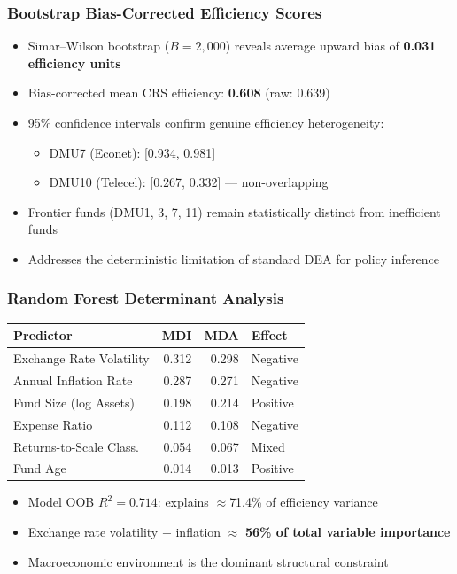 \documentclass{beamer}
\begin{document}
\begin{frame}
    \frametitle{Bootstrap Bias-Corrected Efficiency Scores}
    \begin{itemize}
        \item Simar--Wilson bootstrap ($B = 2{,}000$) reveals average upward bias of \textbf{0.031 efficiency units}
        \item Bias-corrected mean CRS efficiency: \textbf{0.608} (raw: 0.639)
        \item 95\% confidence intervals confirm genuine efficiency heterogeneity:
        \begin{itemize}
            \item DMU7 (Econet): [0.934, 0.981]
            \item DMU10 (Telecel): [0.267, 0.332] --- non-overlapping
        \end{itemize}
        \item Frontier funds (DMU1, 3, 7, 11) remain statistically distinct from inefficient funds
        \item Addresses the deterministic limitation of standard DEA for policy inference
    \end{itemize}
\end{frame}

\begin{frame}
    \frametitle{Random Forest Determinant Analysis}
    \begin{table}
    \centering
    \small
    \begin{tabular}{lrrl}
    \hline
    \textbf{Predictor} & \textbf{MDI} & \textbf{MDA} & \textbf{Effect} \\
    \hline
    Exchange Rate Volatility   & 0.312 & 0.298 & Negative \\
    Annual Inflation Rate      & 0.287 & 0.271 & Negative \\
    Fund Size (log Assets)     & 0.198 & 0.214 & Positive \\
    Expense Ratio              & 0.112 & 0.108 & Negative \\
    Returns-to-Scale Class.    & 0.054 & 0.067 & Mixed \\
    Fund Age                   & 0.014 & 0.013 & Positive \\
    \hline
    \end{tabular}
    \end{table}
    \begin{itemize}
        \item Model OOB $R^2 = 0.714$: explains $\approx$71.4\% of efficiency variance
        \item Exchange rate volatility + inflation $\approx$ \textbf{56\% of total variable importance}
        \item Macroeconomic environment is the dominant structural constraint
    \end{itemize}
\end{frame}
\end{document}
